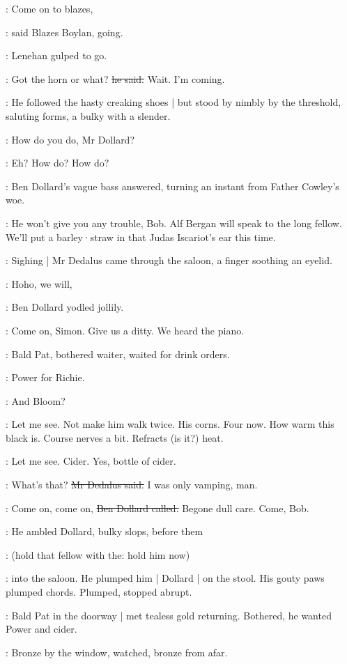 \boylan:
Come on to blazes,

:
said Blazes Boylan,
going.

:
Lenehan gulped to go.

\lenehan:
Got the horn or what?
\sout{he said.}
Wait.
I'm coming.

:
He followed the hasty creaking shoes |
but stood by nimbly by the threshold,
saluting forms,
a bulky with a slender.

\lenehan:
How do you do,
Mr Dollard?

\dollard:
Eh?
How do?
How do?

:
Ben Dollard's vague bass answered,
turning an instant from Father Cowley's woe.

\dollard:
He won't give you any trouble,
Bob.
Alf Bergan will speak to the long fellow.
We'll put a barley·straw in that Judas Iscariot's ear
this time.

:
Sighing |
Mr Dedalus came through the saloon,
a finger soothing an eyelid.

\dollard:
Hoho,
we will,

:
Ben Dollard yodled jollily.

\dollard:
Come on,
Simon.
Give us a ditty.
We heard the piano.

:
Bald Pat,
bothered waiter,
waited for drink orders.

:
Power for Richie.

:
And Bloom?

\BloomIntA:
Let me see.
Not make him walk twice.
His corns.
Four now.
How warm this black is.
Course nerves a bit.
Refracts (is it?) heat.

\Bloom:
Let me see.
Cider.
Yes,
bottle of cider.

\simon:
What's that?
\sout{Mr Dedalus said.}
I was only vamping,
man.

\dollard:
Come on,
come on,
\sout{Ben Dollard called.}
Begone dull care.
Come,
Bob.

:
He ambled Dollard,
bulky slops,
before them

\simon:
(hold that fellow with the:
hold him now)

:
into the saloon.
He plumped him |
Dollard |
on the stool.
His gouty paws plumped chords.
Plumped,
stopped abrupt.

:
Bald Pat in the doorway |
met tealess gold returning.
Bothered,
he wanted Power and cider.

:
Bronze by the window,
watched,
bronze from afar.

